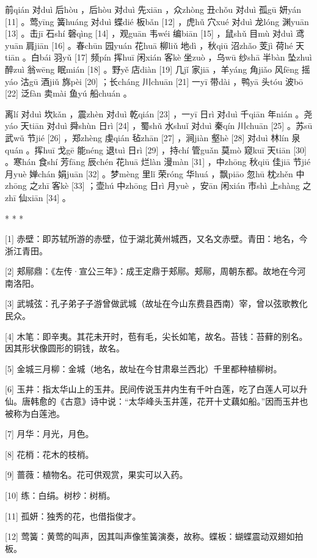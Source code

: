 \documentclass[12pt,UTF8]{ctexbook}
\begin{document}
前qián 对duì 后hòu ，后hòu 对duì 先xiān ，众zhòng 丑chǒu 对duì 孤gū 妍yán [11] 。莺yīng 簧huáng 对duì 蝶dié 板bǎn [12] ，虎hǔ 穴xué 对duì 龙lóng 渊yuān [13] 。击jī 石shí 磬qìng [14] ，观guān 韦wéi 编biān [15] ，鼠shǔ 目mù 对duì 鸢yuān 肩jiān [16] 。春chūn 园yuán 花huā 柳liǔ 地dì ，秋qiū 沼zhǎo 芰jì 荷hé 天tiān 。白bái 羽yǔ [17] 频pín 挥huī 闲xián 客kè 坐zuò ，乌wū 纱shā 半bàn 坠zhuì 醉zuì 翁wēng 眠mián [18] 。野yě 店diàn [19] 几jǐ 家jiā ，羊yáng 角jiǎo 风fēng 摇yáo 沽gū 酒jiǔ 旆pèi [20] ；长cháng 川chuān [21] 一yī 带dài ，鸭yā 头tóu 波bō [22] 泛fàn 卖mài 鱼yú 船chuán 。

离lí 对duì 坎kǎn ，震zhèn 对duì 乾qián [23] ，一yī 日rì 对duì 千qiān 年nián 。尧yáo 天tiān 对duì 舜shùn 日rì [24] ，蜀shǔ 水shuǐ 对duì 秦qín 川chuān [25] 。苏sū 武wǔ 节jié [26] ，郑zhèng 虔qián 毡zhān [27] ，涧jiàn 壑hè [28] 对duì 林lín 泉quán 。挥huī 戈gē 能néng 退tuì 日rì [29] ，持chí 管guǎn 莫mò 窥kuī 天tiān [30] 。寒hán 食shí 芳fāng 辰chén 花huā 烂làn 漫màn [31] ，中zhōng 秋qiū 佳jiā 节jié 月yuè 婵chán 娟juān [32] 。梦mèng 里lǐ 荣róng 华huá ，飘piāo 忽hū 枕zhěn 中zhōng 之zhī 客kè [33] ；壶hú 中zhōng 日rì 月yuè ，安ān 闲xián 市shì 上shàng 之zhī 仙xiān [34] 。



* * *



[1] 赤壁：即苏轼所游的赤壁，位于湖北黄州城西，又名文赤壁。青田：地名，今浙江青田。

[2] 郏鄏鼎：《左传·宣公三年》：成王定鼎于郏鄏。郏鄏，周朝东都。故地在今河南洛阳。

[3] 武城弦：孔子弟子子游曾做武城（故址在今山东费县西南）宰，曾以弦歌教化民众。

[4] 木笔：即辛夷。其花未开时，苞有毛，尖长如笔，故名。苔钱：苔藓的别名。因其形状像圆形的铜钱，故名。

[5] 金城三月柳：金城（地名，故址在今甘肃皋兰西北）千里都种植柳树。

[6] 玉井：指太华山上的玉井。民间传说玉井内生有千叶白莲，吃了白莲人可以升仙。唐韩愈的《古意》诗中说：“太华峰头玉井莲，花开十丈藕如船。”因而玉井也被称为白莲池。

[7] 月华：月光，月色。

[8] 花梢：花木的枝梢。

[9] 蔷薇：植物名。花可供观赏，果实可以入药。

[10] 练：白绢。树杪：树梢。

[11] 孤妍：独秀的花，也借指俊才。

[12] 莺簧：黄莺的叫声，因其叫声像笙簧演奏，故称。蝶板：蝴蝶震动双翅如拍板。
\end{document}
